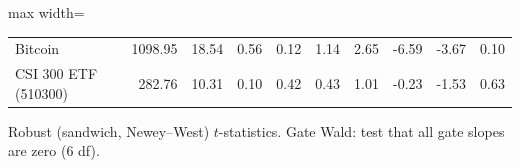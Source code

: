 \begin{table}[!htbp]
\begin{adjustbox}{max width=\textwidth}
\begin{tabular}{lrrrrrrrrr}
Bitcoin & 1098.95 & 18.54 & 0.56 & 0.12 & 1.14 & 2.65 & -6.59 & -3.67 & 0.10\\
CSI 300 ETF (510300) & 282.76 & 10.31 & 0.10 & 0.42 & 0.43 & 1.01 & -0.23 & -1.53 & 0.63\\
\bottomrule
\end{tabular}
\end{adjustbox}
\par\smallskip\begin{minipage}{\textwidth}\footnotesize
Robust (sandwich, Newey--West) $t$-statistics. Gate Wald: test that all gate slopes are zero (6 df).
\end{minipage}
\end{table}